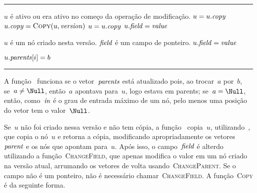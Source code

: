 \documentclass[../../main.tex]{subfiles}
\begin{document}
\vspace{1em}
\hrule
\begin{algorithmic}[1]

\Require $u$ é ativo ou era ativo no começo da operação de modificação.
		\State $u = u.\mathit{copy}$
	\EndIf
		\State $u.\V{copy} = \Call{Copy}{u, \V{version}}$ \label{line:modify:copy}
		\State $u = u.\mathit{copy}$
	\EndIf
		\State {}
	\Else
		\State $u.\mathit{field} = \mathit{value}$
	\EndIf
\EndFunction

\Require $u$ é um nó criado nesta versão. 
\Require $\mathit{field}$ é um campo de ponteiro.
		\State {}
	\EndIf
	\State $u.\mathit{field} = \mathit{value}$
		\State {}
	\EndIf
\EndFunction

			\State $u.\mathit{parents}[i] = b$
			\State \Return
		\EndIf
	\EndFor
\EndFunction

\end{algorithmic}
\hrule
\vspace{1em}

A função~ funciona se o vetor~$\mathit{parents}$ está atualizado pois, ao trocar~$a$ por~$b$, se~$a \neq \Null$, então~$a$ apontava para~$u$, logo estava em parents; se~$a = \Null$, então, como~$\mathit{in}$ é o grau de entrada máximo de um nó, pelo menos uma posição do vetor tem o valor~$\Null$.

Se~$u$ não foi criado nessa versão e não tem cópia, a função~ copia~$u$, utilizando~, que copia o nó~$u$ e retorna a cópia, modificando apropriadamente os vetores~$\mathit{parent}$ e os nós que apontam para~$u$. Após isso, o campo~$\mathit{field}$ é alterdo utilizando a função~\textsc{ChangeField}, que apenas modifica o valor em um nó criado na versão atual, arrumando os vetores de volta usando~\textsc{ChangeParent}. Se o campo não é um ponteiro, não é necessário chamar~\textsc{ChangeField}.
A função~\textsc{Copy} é da seguinte forma.
\end{document}
